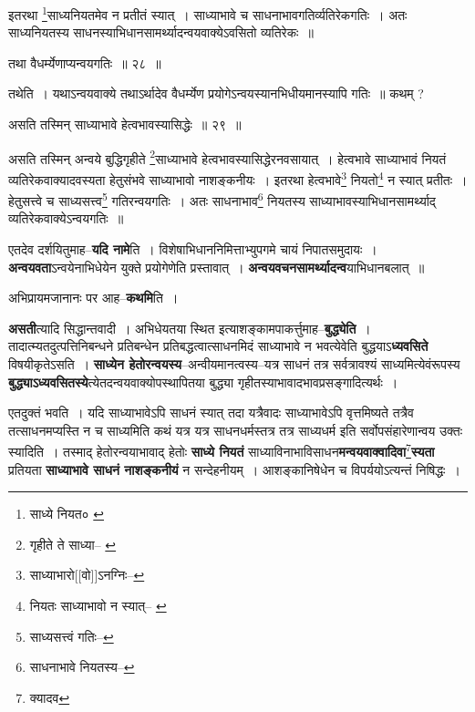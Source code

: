\documentclass[article,12pt,a4paper]{memoir}
\begin{document}
	  \pstart इतरथा \footnote{साध्ये नियत० \cite{dp-msC}}साध्यनियतमेव न प्रतीतं स्यात् । साध्याभावे च साधनाभावगतिर्व्यतिरेकगतिः । अतः साध्यनियतस्य साधनस्याभिधानसामर्थ्यादन्वयवाक्येऽवसितो व्यतिरेकः ॥
	\pend
       
	  \bigskip
	  \begingroup
	

	  \pstart तथा वैधर्म्येणाप्यन्वयगतिः ॥ २८ ॥
	\pend
      
	  \endgroup
	 

	  \pstart तथेति । यथाऽन्वयवाक्ये तथाऽर्थादेव वैधर्म्येण प्रयोगेऽन्वयस्यानभिधीयमानस्यापि गतिः ॥ कथम् ?
	\pend
       
	  \bigskip
	  \begingroup
	

	  \pstart असति तस्मिन् साध्याभावे हेत्वभावस्यासिद्धेः ॥ २९ ॥
	\pend
      
	  \endgroup
	 

	  \pstart असति तस्मिन् अन्वये बुद्धिगृहीते \footnote{गृहीते ते साध्या--\cite{dp-msA} \cite{dp-edP} \cite{dp-edH}}साध्याभावे हेत्वभावस्यासिद्धेरनवसायात् । हेत्वभावे साध्याभावं नियतं व्यतिरेकवाक्यादवस्यता हेतुसंभवे साध्याभावो नाशङ्कनीयः । इतरथा हेत्वभावे\footnote{साध्याभारो[[वो]]ऽनग्निः--\cite{dp-msD-n}} नियतो\footnote{नियतः साध्याभावो न स्यात्--\cite{dp-msA} \cite{dp-msB} \cite{dp-msD} \cite{dp-edP} \cite{dp-edH} \cite{dp-edE} \cite{dp-edN}} न स्यात् प्रतीतः । हेतुसत्त्वे च साध्यसत्त्व\footnote{साध्यसत्त्वं गतिः--\cite{dp-msA}} गतिरन्वयगतिः । अतः साधनाभाव\footnote{साधनाभावे नियतस्य--\cite{dp-msC}} नियतस्य साध्याभावस्याभिधानसामर्थ्याद् व्यतिरेकवाक्येऽन्वयगतिः ॥
	\pend
      
	  \endgroup
	

	  \pstart एतदेव दर्शयितुमाह--\textbf{यदि नामे}ति । विशेषाभिधाननिमित्ताभ्युपगमे चायं निपातसमुदायः । \textbf{अन्वयवता}ऽन्वयेनाभिधेयेन युक्ते प्रयोगेणेति प्रस्तावात् । \textbf{अन्वयवचनसामर्थ्यादन्व}\leavevmode{}याभिधानबलात् ॥
	\pend
      

	  \pstart अभिप्रायमजानानः पर आह--\textbf{कथमि}ति ।
	\pend
      

	  \pstart \textbf{असती}त्यादि सिद्धान्तवादी । अभिधेयतया स्थित इत्याशङ्कामपाकर्त्तुमाह--\textbf{बुद्ध्येति} । तादात्म्यतदुत्पत्तिनिबन्धने प्रतिबन्धेन प्रतिबद्धत्वात्साधनमिदं साध्याभावे न भवत्येवेति बुद्धयाऽ\textbf{ध्यवसिते} विषयीकृतेऽसति । \textbf{साध्येन हेतोरन्वयस्य}--अन्वीयमानत्वस्य--यत्र साधनं तत्र सर्वत्रावश्यं साध्यमित्येवंरूपस्य \textbf{बुद्ध्याऽध्यवसितस्ये}त्येतदन्वयवाक्योपस्थापितया बुद्ध्या गृहीतस्याभावादभावप्रसङ्गादित्यर्थः ।
	\pend
      

	  \pstart एतदुक्तं भवति । यदि साध्याभावेऽपि साधनं स्यात् तदा यत्रैवादः साध्याभावेऽपि वृत्तमिष्यते तत्रैव तत्साधनमप्यस्ति न च साध्यमिति कथं यत्र यत्र साधनधर्मस्तत्र तत्र साध्यधर्म इति सर्वोपसंहारेणान्वय उक्तः स्यादिति । तस्माद् हेतोरन्वयाभावाद् हेतोः \textbf{साध्ये नियतं} साध्याविनाभाविसाधन\textbf{मन्वयवाक्वादिवा}\footnote{क्यादव}\textbf{स्यता} प्रतियता \textbf{साध्याभावे साधनं नाशङ्कनीयं} न सन्देहनीयम् । आशङ्कानिषेधेन च विपर्ययोऽत्यन्तं निषिद्धः ।
	\pend
      
\end{document}
